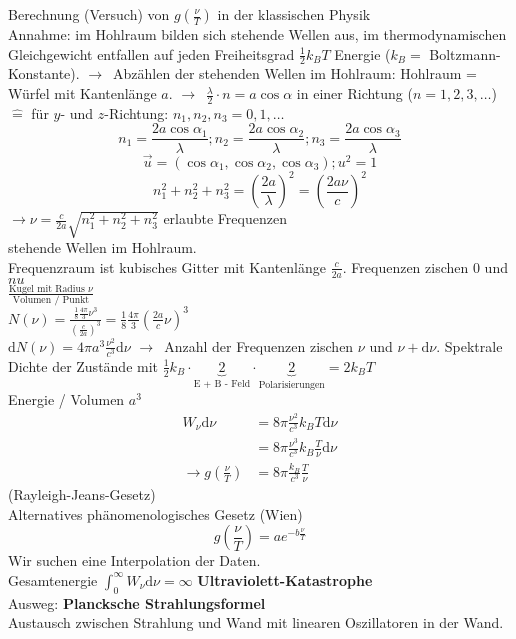\documentclass[oneside]{book}
\theoremstyle{definition}
\newcommand{\conseq}{$\rightarrow$~}
\renewcommand{\d}{\mathrm d}
\begin{document}
Berechnung (Versuch) von $g(\frac{\nu}{T})$ in der klassischen Physik\\
Annahme: im Hohlraum bilden sich stehende Wellen aus, im thermodynamischen Gleichgewicht entfallen auf jeden Freiheitsgrad $\frac12 k_B T$ Energie ($k_B =$ Boltzmann-Konstante).
\conseq Abzählen der stehenden Wellen im Hohlraum:
Hohlraum = Würfel mit Kantenlänge $a$. \conseq $\frac{\lambda}{2}\cdot n = a \cos \alpha$ in einer Richtung ($n = 1, 2, 3, \dots$) $\hat =$ für $y$- und $z$-Richtung: $n_1, n_2, n_3 = 0, 1, \dots$
$$n_1 = \frac{2 a \cos \alpha_1}{\lambda}; n_2 = \frac{2 a \cos \alpha_2}{\lambda}; n_3 = \frac{2 a \cos \alpha_3}{\lambda}$$
$$\vec{u} = (\cos \alpha_1, \cos \alpha_2, \cos \alpha_3); u^2 = 1$$
$$n_1^2 + n_2^2 + n_3^2 = (\frac{2a}{\lambda})^2 = (\frac{2 a \nu}{c})^2$$
$\rightarrow \nu = \frac{c}{2a} \sqrt{n_1^2 + n_2^2 + n_3^2}$ erlaubte Frequenzen\\
stehende Wellen im Hohlraum.\\
Frequenzraum ist kubisches Gitter mit Kantenlänge $\frac{c}{2a}$. Frequenzen zischen 0 und $nu$\\
$\frac{\text{Kugel mit Radius~}\nu}{\text{Volumen / Punkt}}$\\
$N(\nu) = \frac{\frac18 \frac{4\pi}{3} \nu^3}{(\frac{c}{2a})^3} = \frac18 \frac{4\pi}{3} (\frac{2a}{c}\nu)^3$\\
$\d N(\nu) = 4 \pi a^3 \frac{\nu^2}{c^3} \d \nu$ \conseq Anzahl der Frequenzen zischen $\nu$ und $\nu + \d \nu$. Spektrale Dichte der Zustände mit $\frac12 k_B \cdot \underbrace{2}_{\text{E + B - Feld}} \cdot \underbrace{2}_{\text{Polarisierungen}} = 2 k_B T$\\
Energie / Volumen $a^3$
\begin{align*}
	W_\nu \d \nu &= 8 \pi \frac{\nu^2}{c^3} k_B T \d \nu\\
	&= 8 \pi \frac{\nu^3}{c^3} k_B \frac{T}{\nu} \d \nu\\
	\rightarrow g(\frac{\nu}{T}) &= 8 \pi \frac{k_B}{c^3} \frac{T}{\nu}
\end{align*}
(Rayleigh-Jeans-Gesetz)\\
Alternatives phänomenologisches Gesetz (Wien)
$$g(\frac{\nu}{T}) = a e^{- b \frac{\nu}{T}}$$
Wir suchen eine Interpolation der Daten.\\
Gesamtenergie $\int_0^\infty W_\nu \d \nu = \infty$ \textbf{Ultraviolett-Katastrophe}\\
Ausweg: \textbf{Plancksche Strahlungsformel}\\
Austausch zwischen Strahlung und Wand mit linearen Oszillatoren in der Wand.\\
\end{document}
